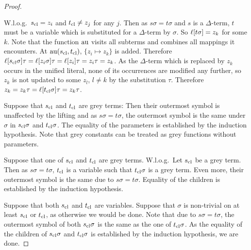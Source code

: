 \documentclass[,%
	paper=a4,%
	twoside=false,%
	liststotoc,
	bibtotoc,
	draft=false,%
	numbers=noendperiod
]{scrartcl}
\begin{document}
\begin{proof}
\begin{compactitem}
		\item W.l.o.g.~$s_\mathrm{cl} = z_i$ and $t_\mathrm{cl} \neq z_j$ for any $j$.
			Then as $s\sigma = t\sigma$ and $s$ is a $\Delta$-term, $t$ must be a variable which is substituted for a $\Delta$-term by $\sigma$.
			So $\ell[t\sigma] = z_k$ for some $k$.
			Note that the function $\operatorname{au}$ visits all subterms and combines all mappings it encounters.
			At $\operatorname{au}(s_\mathrm{cl}, t_\mathrm{cl})$, $\{ z_i \mapsto z_k \}$ is added.
			Therefore $\ell[s_\mathrm{cl}\sigma]\tau = \ell[z_i\sigma]\tau = \ell[z_i]\tau = z_i\tau = z_k$.
			As the $\Delta$-term which is replaced by $z_k$ occurs in the unified literal, none of its occurrences are modified any further, so $z_k$ is not updated to some $z_l$, $l\neq k$ by the substitution $\tau$.
			Therefore $z_k = z_k \tau = \ell[t_\mathrm{cl}\sigma]\tau = z_k \tau$. 
	\end{compactitem}

	Suppose that $s_\mathrm{cl}$ and $t_\mathrm{cl}$ are grey terms:
	Then their outermost symbol is unaffected by the lifting and as $s\sigma = t\sigma$, the outermost symbol is the same under $\sigma$ in $s_\mathrm{cl} \sigma$ and $t_\mathrm{cl}\sigma$.
	The equality of the parameters is established by the induction hypothesis.
	Note that grey constants can be treated as grey functions without parameters.

	Suppose that one of $s_\mathrm{cl}$ and $t_\mathrm{cl}$ are grey terms. W.l.o.g.~Let $s_\mathrm{cl}$ be a grey term. Then as $s\sigma=t\sigma$, $t_\mathrm{cl}$ is a variable such that $t_\mathrm{cl}\sigma$ is a grey term. 
	Even more, their outermost symbol is the same due to $s\sigma = t\sigma$.
	Equality of the children is established by the induction hypothesis.


	Suppose that both $s_\mathrm{cl}$ and $t_\mathrm{cl}$ are variables. 
	Suppose that $\sigma$ is non-trivial on at least $s_\mathrm{cl}$ or $t_\mathrm{cl}$, as otherwise we would be done.
	Note that due to $s\sigma = t\sigma$, the outermost symbol of both $s_\mathrm{cl}\sigma$ is the same as the one of $t_\mathrm{cl}\sigma$. As the equality of the children of $s_\mathrm{cl}\sigma$ and $t_\mathrm{cl}\sigma$ is established by the induction hypothesis, we are done.
\end{proof}
\end{document}
